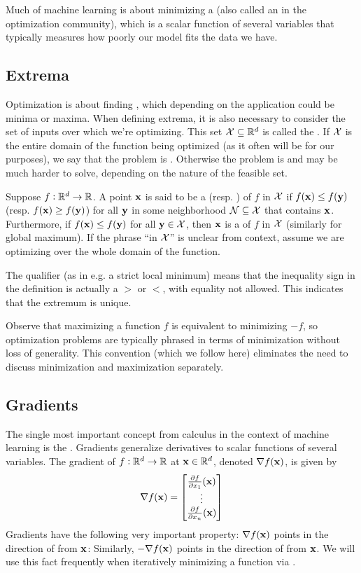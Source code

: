 Much of machine learning is about minimizing a  (also called an  in the optimization community), which is a scalar function of several variables that typically measures how poorly our model fits the data we have.

\subsection{Extrema}
Optimization is about finding , which depending on the application could be minima or maxima.
When defining extrema, it is also necessary to consider the set of inputs over which we're optimizing.
This set $\mathcal{X} \subseteq \mathbb{R}^d$ is called the .
If $\mathcal{X}$ is the entire domain of the function being optimized (as it often will be for our purposes), we say that the problem is .
Otherwise the problem is  and may be much harder to solve, depending on the nature of the feasible set.

Suppose $f : \mathbb{R}^d \to \mathbb{R}$.
A point $\mathbf{x}$ is said to be a  (resp. ) of $f$ in $\mathcal{X}$ if $f(\mathbf{x}) \leq f(\mathbf{y})$ (resp. $f(\mathbf{x}) \geq f(\mathbf{y})$) for all $\mathbf{y}$ in some neighborhood $\mathcal{N} \subseteq \mathcal{X}$ that contains $\mathbf{x}$.
Furthermore, if $f(\mathbf{x}) \leq f(\mathbf{y})$ for all $\mathbf{y} \in \mathcal{X}$, then $\mathbf{x}$ is a  of $f$ in $\mathcal{X}$ (similarly for global maximum).
If the phrase ``in $\mathcal{X}$'' is unclear from context, assume we are optimizing over the whole domain of the function.

The qualifier  (as in e.g. a strict local minimum) means that the inequality sign in the definition is actually a $>$ or $<$, with equality not allowed.
This indicates that the extremum is unique.

Observe that maximizing a function $f$ is equivalent to minimizing $-f$, so optimization problems are typically phrased in terms of minimization without loss of generality.
This convention (which we follow here) eliminates the need to discuss minimization and maximization separately.

\subsection{Gradients}
The single most important concept from calculus in the context of machine learning is the .
Gradients generalize derivatives to scalar functions of several variables.
The gradient of $f : \mathbb{R}^d \to \mathbb{R}$ at $\mathbf{x} \in \mathbb{R}^d$, denoted $\nabla f(\mathbf{x})$, is given by
\[\nabla f(\mathbf{x}) = \begin{bmatrix}{\pdv{f}{x_1}}(\mathbf{x}) \\ \vdots \\ {\pdv{f}{x_n}}(\mathbf{x})\end{bmatrix}\]
Gradients have the following very important property: $\nabla f(\mathbf{x})$ points in the direction of  from $\mathbf{x}$:
Similarly, $-\nabla f(\mathbf{x})$ points in the direction of  from $\mathbf{x}$.
We will use this fact frequently when iteratively minimizing a function via .

